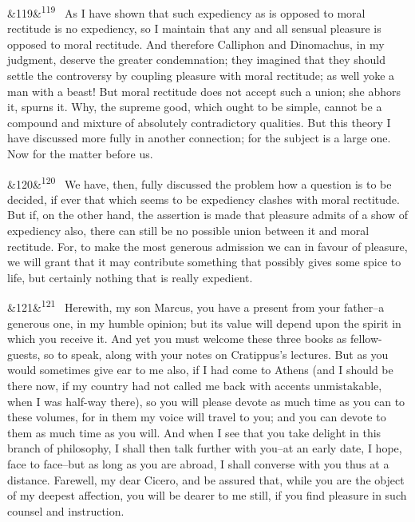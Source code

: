 \documentclass[12pt]{article}
\newcommand{\para}[1][]{\par\noindent\ifx&#1&\else\textsuperscript{\footnotesize #1}~\fi}
\begin{document}
\para[119] As I have shown that such expediency as is opposed to moral rectitude is no expediency, so I maintain that any and all sensual pleasure is opposed to moral rectitude. And therefore Calliphon and Dinomachus, in my judgment, deserve the greater condemnation; they imagined that they should settle the controversy by coupling pleasure with moral rectitude; as well yoke a man with a beast! But moral rectitude does not accept such a union; she abhors it, spurns it. Why, the supreme good, which ought to be simple, cannot be a compound and mixture of absolutely contradictory qualities. But this theory I have discussed more fully in another connection; for the subject is a large one. Now for the matter before us.

\para[120] We have, then, fully discussed the problem how a question is to be decided, if ever that which seems to be expediency clashes with moral rectitude. But if, on the other hand, the assertion is made that pleasure admits of a show of expediency also, there can still be no possible union between it and moral rectitude. For, to make the most generous admission we can in favour of pleasure, we will grant that it may contribute something that possibly gives some spice to life, but certainly nothing that is really expedient.

\para[121] Herewith, my son Marcus, you have a present from your father--a generous one, in my humble opinion; but its value will depend upon the spirit in which you receive it. And yet you must welcome these three books as fellow-guests, so to speak, along with your notes on Cratippus's lectures. But as you would sometimes give ear to me also, if I had come to Athens (and I should be there now, if my country had not called me back with accents unmistakable, when I was half-way there), so you will please devote as much time as you can to these volumes, for in them my voice will travel to you; and you can devote to them as much time as you will. And when I see that you take delight in this branch of philosophy, I shall then talk further with you--at an early date, I hope, face to face--but as long as you are abroad, I shall converse with you thus at a distance. Farewell, my dear Cicero, and be assured that, while you are the object of my deepest affection, you will be dearer to me still, if you find pleasure in such counsel and instruction.
\end{document}
